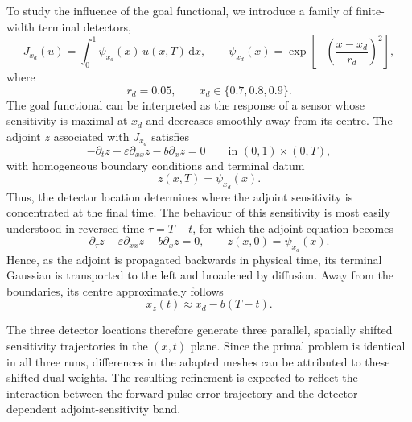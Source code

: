 To study the influence of the goal functional, we introduce a family of finite-width terminal detectors,
\begin{equation}
  J_{x_d}(u)
  =
  \int_0^1
  \psi_{x_d}(x)\,u(x,T)\,\mathrm{d}x,
  \qquad
  \psi_{x_d}(x)
  =
  \exp\!\left[
    -\left(\frac{x-x_d}{r_d}\right)^2
  \right],
  \label{eq:qoi-gaussian-family}
\end{equation}
where
\begin{equation}
  r_d=0.05,
  \qquad
  x_d\in\{0.7,0.8,0.9\}.
  \label{eq:sensor-locations}
\end{equation}
The goal functional can be interpreted as the response of a sensor whose sensitivity is maximal at $x_d$ and decreases smoothly away from its centre. The adjoint \(z\) associated with \(J_{x_d}\) satisfies
\begin{equation}
-\partial_t z
-\varepsilon\partial_{xx}z
-b\partial_xz
=0
\qquad
\text{in }(0,1)\times(0,T),
\label{eq:advection-diffusion-adjoint}
\end{equation}
with homogeneous boundary conditions and terminal datum
\begin{equation}
z(x,T)=\psi_{x_d}(x).
\label{eq:advection-diffusion-adjoint-terminal}
\end{equation}
Thus, the detector location determines where the adjoint sensitivity is concentrated at the final time. The behaviour of this sensitivity is most easily understood in reversed time \(\tau=T-t\), for which the adjoint equation becomes
\begin{equation}
\partial_\tau z
-\varepsilon\partial_{xx}z
-b\partial_xz
=0,
\qquad
z(x,0)=\psi_{x_d}(x).
\label{eq:advection-diffusion-adjoint-reversed-time}
\end{equation}
Hence, as the adjoint is propagated backwards in physical time, its terminal Gaussian is transported to the left and broadened by diffusion. Away from the boundaries, its centre approximately follows
\begin{equation}
x_z(t)\approx x_d-b(T-t).
\label{eq:advection-diffusion-adjoint-centre}
\end{equation}

The three detector locations therefore generate three parallel, spatially shifted sensitivity trajectories in the \((x,t)\) plane. Since the primal problem is identical in all three runs, differences in the adapted meshes can be attributed to these shifted dual weights. The resulting refinement is expected to reflect the interaction between the forward pulse-error trajectory and the detector-dependent adjoint-sensitivity band.



